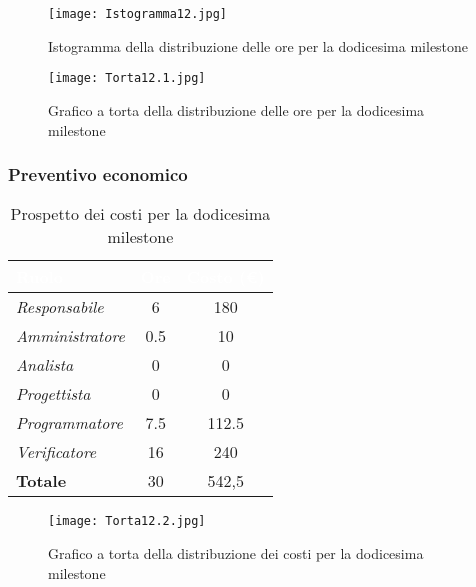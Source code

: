 \begin{figure}[H]
    \texttt{[image: Istogramma12.jpg]}
    \caption{Istogramma della distribuzione delle ore per la dodicesima milestone}
\end{figure}

\begin{figure}[H]
    \texttt{[image: Torta12.1.jpg]}
    \caption{Grafico a torta della distribuzione delle ore per la dodicesima milestone}
\end{figure}

\newpage
\subsubsection{Preventivo economico}

\begin{table}[H]
    \renewcommand\arraystretch{1.5}
    \centering
    \begin{tabular}{|l|c|c|}
    \hline
    \rowcolor[HTML]{036400}
    \textcolor{white}{\textbf{Ruolo}} & \multicolumn{1}{l|}{\textcolor{white}{\textbf{Ore}}} & \multicolumn{1}{l|}{\textcolor{white}{\textbf{Costo (€)}}} \\ \hline
    \rowcolor[HTML]{EFEFEF}\textit{Responsabile}   & 6      & 180    \\ \hline
    \rowcolor[HTML]{C0C0C0}\textit{Amministratore} & 0.5    & 10     \\ \hline
    \rowcolor[HTML]{EFEFEF}\textit{Analista}       & 0      & 0      \\ \hline
    \rowcolor[HTML]{C0C0C0}\textit{Progettista}    & 0      & 0      \\ \hline
    \rowcolor[HTML]{EFEFEF}\textit{Programmatore}  & 7.5    & 112.5  \\ \hline
    \rowcolor[HTML]{C0C0C0}\textit{Verificatore}   & 16     & 240    \\ \hline
    \rowcolor[HTML]{EFEFEF}\textbf{Totale}         & 30     & 542,5  \\ \hline
    \end{tabular}
    \caption{Prospetto dei costi per la dodicesima milestone}
\end{table}

\begin{figure}[H]
    \texttt{[image: Torta12.2.jpg]}
    \caption{Grafico a torta della distribuzione dei costi per la dodicesima milestone}
\end{figure}
